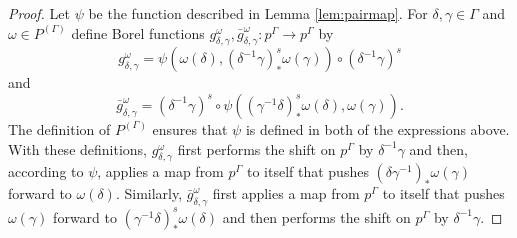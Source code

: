 \documentclass[12pt]{amsart}
\theoremstyle{definition}
\begin{document}
\begin{proof}
	Let $\psi$ be the function described in Lemma \ref{lem:pairmap}. For $\delta, \gamma \in \Gamma$ and $\omega \in P^{(\Gamma)}$ define Borel functions $g_{\delta, \gamma}^\omega, \bar g_{\delta, \gamma}^\omega : p^\Gamma \rightarrow p^\Gamma$ by
	\[g_{\delta, \gamma}^\omega = \psi(\omega(\delta), (\delta^{-1} \gamma)^s_* \omega(\gamma)) \circ (\delta^{-1} \gamma)^s\]
	and
	\[\bar g_{\delta, \gamma}^\omega = (\delta^{-1} \gamma)^s \circ \psi((\gamma^{-1} \delta)^s_* \omega(\delta), \omega(\gamma)).\]
	The definition of $P^{(\Gamma)}$ ensures that $\psi$ is defined in both of the expressions above. With these definitions, $g_{\delta, \gamma}^\omega$ first performs the shift on $p^\Gamma$ by $\delta^{-1} \gamma$ and then, according to $\psi$, applies a map from $p^\Gamma$ to itself that pushes $(\delta \gamma^{-1})_* \omega(\gamma)$ forward to $\omega(\delta)$. Similarly, $\bar g_{\delta, \gamma}^\omega$ first applies a map from $p^\Gamma$ to itself that pushes $\omega(\gamma)$ forward to $(\gamma^{-1} \delta)^s_* \omega(\delta)$ and then performs the shift on $p^\Gamma$ by $\delta^{-1} \gamma$.
	

\end{proof}
\end{document}
